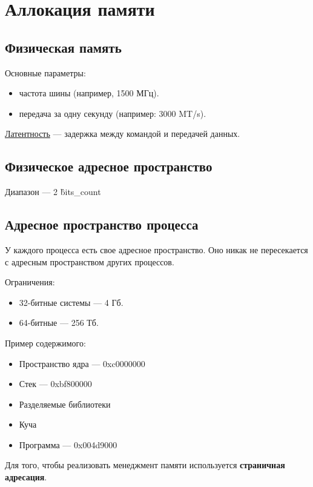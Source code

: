 \section{Аллокация памяти}

\subsection{Физическая память}

Основные параметры:
\begin{itemize}
	\item частота шины (например, 1500 МГц).
	\item передача за одну секунду (например: 3000 MT/s).
\end{itemize}

\begin{Def}
	\underline{Латентность} --- задержка между командой и передачей данных.
\end{Def}

\subsection{Физическое адресное пространство}

Диапазон --- 2 \^ bits\_count

\subsection{Адресное пространство процесса}

У каждого процесса есть свое адресное пространство. Оно никак не пересекается
с адресным пространством других процессов.

Ограничения: 
\begin{itemize}
	\item 32-битные системы --- 4 Гб.
	\item 64-битные --- 256 Тб.
\end{itemize}

Пример содержимого:
\begin{itemize}
	\item Пространство ядра --- 0xc0000000
	\item Стек --- 0xbf800000
	\item Разделяемые библиотеки
	\item Куча
	\item Программа --- 0x004d9000
\end{itemize}

Для того, чтобы реализовать менеджмент памяти используется \textbf{страничная адресация}.


